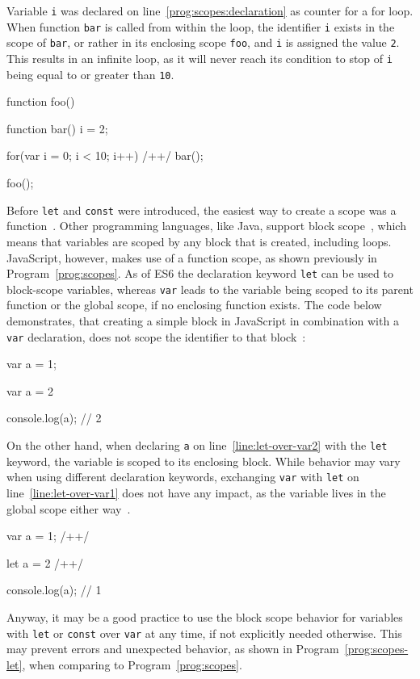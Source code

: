 \begin{program}
\caption{Variable \texttt{i} was declared on line~\ref{prog:scopes:declaration} as counter for a for loop. When function \texttt{bar} is called from within the loop, the identifier \texttt{i} exists in the scope of \texttt{bar}, or rather in its enclosing scope \texttt{foo}, and \texttt{i} is assigned the value \texttt{2}. This results in an infinite loop, as it will never reach its condition to stop of \texttt{i} being equal to or greater than \texttt{10}.~\cite[p.~26]{YDKJS:ScopesAndClosures:Simpson:2014}}
\label{prog:scopes}
\begin{JsCode}
function foo() {

  function bar() {
    i = 2;
  }
  
  for(var i = 0; i < 10; i++) { /+\label{prog:scopes:declaration}+/
    bar();
  }
  
}

foo();
\end{JsCode}
\end{program}

Before \texttt{let} and \texttt{const} were introduced, the easiest way to create a scope was a function~\cite[p.~7]{YDKJS:ES6AndBeyond:Simpson:2015}. Other programming languages, like Java, support block scope~\cite[p.~7]{YDKJS:ScopesAndClosures:Simpson:2014}, which means that variables are scoped by any block that is created, including loops. JavaScript, however, makes use of a function scope, as shown previously in Program~\ref{prog:scopes}. As of ES6 the declaration keyword \texttt{let} can be used to block-scope variables, whereas \texttt{var} leads to the variable being scoped to its parent function or the global scope, if no enclosing function exists. The code below demonstrates, that creating a simple block in JavaScript in combination with a \texttt{var} declaration, does not scope the identifier to that block~\cite[p.~8]{YDKJS:ES6AndBeyond:Simpson:2015}:
\begin{JsCode}
var a = 1;

{
  var a = 2
}

console.log(a); // 2
\end{JsCode}
On the other hand, when declaring \texttt{a} on line~\ref{line:let-over-var2} with the \texttt{let} keyword, the variable is scoped to its enclosing block. While behavior may vary when using different declaration keywords, exchanging \texttt{var} with \texttt{let} on line~\ref{line:let-over-var1} does not have any impact, as the variable lives in the global scope either way~\cites{variable-scope:Microsoft:2017, var:MDN:2017}.
\begin{JsCode}
var a = 1; /+\label{line:let-over-var1}+/

{
  let a = 2 /+\label{line:let-over-var2}+/
}

console.log(a); // 1
\end{JsCode}
Anyway, it may be a good practice to use the block scope behavior for variables with \texttt{let} or \texttt{const} over \texttt{var} at any time, if not explicitly needed otherwise. This may prevent errors and unexpected behavior, as shown in Program~\ref{prog:scopes-let}, when comparing to Program~\ref{prog:scopes}.

